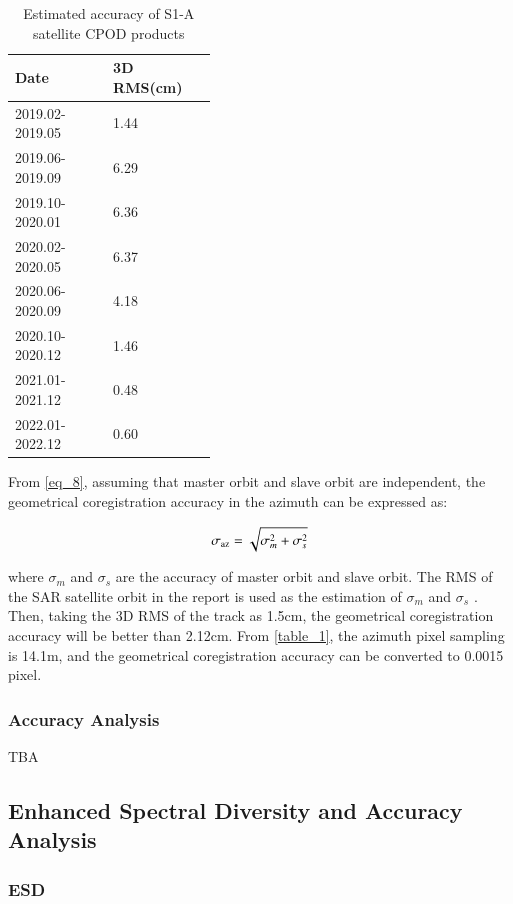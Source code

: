 \documentclass[preprint, authoryear]{elsarticle}
\begin{document}
\begin{table}[htbp]
\centering
\caption{Estimated accuracy of S1-A satellite CPOD products}
\label{table_2}
\footnotesize
{}
\begin{tabular}{p{0.25\linewidth}p{0.15\linewidth}}
\toprule
Date & 3D RMS(cm) \\ %
\midrule
2019.02-2019.05 & 1.44 \\
2019.06-2019.09 & 6.29 \\
2019.10-2020.01 & 6.36 \\
2020.02-2020.05 & 6.37 \\
2020.06-2020.09 & 4.18 \\
2020.10-2020.12 & 1.46 \\
2021.01-2021.12 & 0.48 \\
2022.01-2022.12 & 0.60 \\
\bottomrule
\end{tabular}
\end{table}

From \ref{eq_8}, assuming that master orbit and slave orbit are independent, the geometrical coregistration accuracy in the azimuth can be expressed as: \par

\begin{equation}
    \sigma_{\rm az} = \sqrt{\sigma_m^2 + \sigma_s^2}
    \label{eq_9}
\end{equation}

\noindent where $\sigma_m$ and $\sigma_s$ are the accuracy of master orbit and slave orbit. The RMS of the SAR satellite orbit in the report is used as the estimation of $\sigma_m$ and $\sigma_s$ \cite{InSAR_uncertainty_due_to_orbital_errors}. Then, taking the 3D RMS of the track as 1.5cm, the geometrical coregistration accuracy will be better than 2.12cm. From \ref{table_1}, the azimuth pixel sampling is 14.1m, and the geometrical coregistration accuracy can be converted to 0.0015 pixel. \par

\subsubsection{Accuracy Analysis}
 TBA


\subsection{Enhanced Spectral Diversity and Accuracy Analysis}
\subsubsection{ESD}
\end{document}
